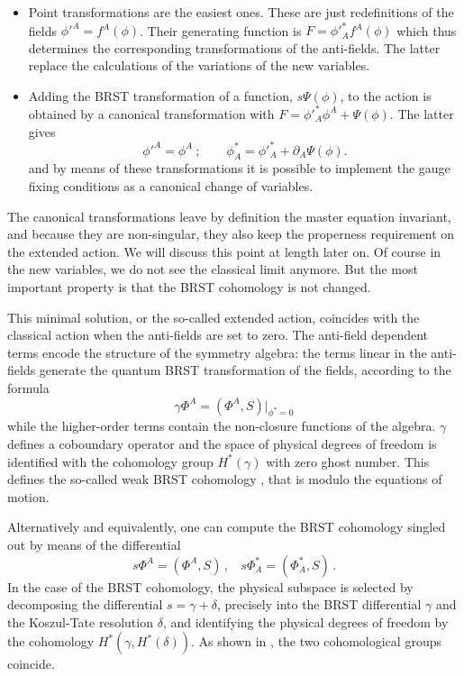 \documentclass[a4paper,12pt]{article}
\begin{document}
\begin{itemize}
\item Point transformations are the easiest ones. These are just
  redefinitions of the fields $\phi '^A=f^A(\phi )$. Their generating
  function is $F=\phi '^*_A f^A(\phi)$ which thus determines the
  corresponding transformations of the anti-fields. The latter replace
  the calculations of the variations of the new variables.
\item Adding the BRST transformation of a function, $s\Psi(\phi )$, to
  the action is obtained by a canonical transformation with $F=\phi
  '^*_A\phi ^A+ \Psi (\phi )$. The latter gives
\begin{equation}
\phi'^A = \phi^A \ ;\qquad
\phi ^*_A =\phi'^*_A + \partial _A \Psi (\phi ).
\label{gfermion}\end{equation}
and by means of these transformations it is possible to implement the
gauge fixing conditions as a canonical change of variables.
\end{itemize}
The canonical transformations leave by definition the master equation
invariant, and because they are non-singular, they also keep the
properness requirement on the extended action. We will discuss this
point at length later on. Of course in the new variables, we do not
see the classical limit anymore. But the most important property is
that the BRST cohomology \cite{anti_coho} is not changed.

This minimal solution, or the so-called extended action, coincides
with the classical action  when the anti-fields are set to zero. The
anti-field dependent terms encode the structure of the symmetry algebra:
the terms linear in the anti-fields generate the quantum BRST
transformation of the fields, according to the formula
\begin{equation}\label{omega}
  \gamma \Phi^A = (\Phi^A, S)|_{\phi^*=0}
\end{equation}
while the higher-order terms contain the non-closure functions of the
algebra. $\gamma$ defines a coboundary operator and the space of physical 
degrees of freedom is identified with the cohomology group $H^*(\gamma)$ 
with zero ghost number. This defines the so-called weak BRST cohomology \cite{henne_libro}, 
that is modulo the equations of motion.  

Alternatively and equivalently, one can compute the BRST cohomology 
singled out by means of the differential 
\begin{equation}\label{esse}
  s \Phi^A = (\Phi^A, S)\,,~~~~  s \Phi^*_A = (\Phi^*_A, S)\,. 
\end{equation}
In the case of the BRST cohomology, the physical subspace is
selected by decomposing the differential $s = \gamma + \delta$,
precisely into the BRST differential $\gamma$ and the Koszul-Tate
resolution $\delta$, and identifying the physical degrees of freedom
by the cohomology $H^*(\gamma,H^*(\delta))$. As shown in
\cite{anti_coho}, the two cohomological groups coincide.
\end{document}
